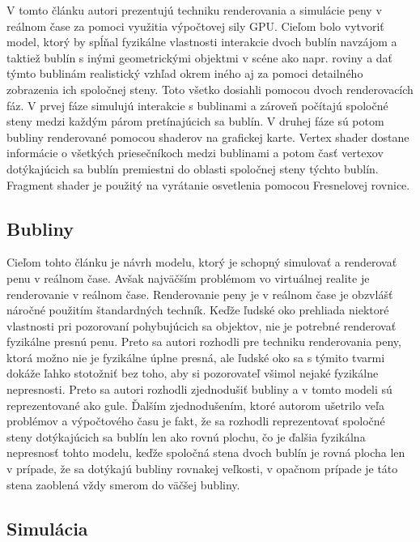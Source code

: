 V tomto článku autori prezentujú techniku renderovania a simulácie peny v reálnom čase za pomoci využitia výpočtovej sily GPU. Cieľom bolo vytvoriť model, ktorý by spĺňal fyzikálne vlastnosti interakcie dvoch bublín navzájom a taktiež bublín s inými geometrickými objektmi v scéne ako napr. roviny a dať týmto bublinám realistický vzhľad okrem iného aj za pomoci detailného zobrazenia ich spoločnej steny. Toto všetko dosiahli pomocou dvoch renderovacích fáz. V prvej fáze simulujú interakcie s bublinami a zároveň počítajú spoločné steny medzi každým párom pretínajúcich sa bublín. V druhej fáze sú potom bubliny renderované pomocou shaderov na grafickej karte. Vertex shader dostane informácie o všetkých priesečníkoch medzi bublinami a potom časť vertexov dotýkajúcich sa bublín premiestni do oblasti spoločnej steny týchto bublín. Fragment shader je použitý na vyrátanie osvetlenia pomocou Fresnelovej rovnice.

\subsection{Bubliny}

Cieľom tohto článku je návrh modelu, ktorý je schopný simulovať a renderovať penu v reálnom čase. Avšak najväčším problémom vo virtuálnej realite je renderovanie v reálnom čase. Renderovanie peny je v reálnom čase je obzvlášť náročné použitím štandardných techník. Keďže ľudské oko prehliada niektoré vlastnosti pri pozorovaní pohybujúcich sa objektov, nie je potrebné renderovať fyzikálne presnú penu. Preto sa autori rozhodli pre techniku renderovania peny, ktorá možno nie je fyzikálne úplne presná, ale ľudské oko sa s týmito tvarmi dokáže ľahko stotožniť bez toho, aby si pozorovateľ všimol nejaké fyzikálne nepresnosti. Preto sa autori rozhodli zjednodušiť bubliny a v tomto modeli sú reprezentované ako gule. Ďalším zjednodušením, ktoré autorom ušetrilo veľa problémov a výpočtového času je fakt, že sa rozhodli reprezentovať spoločné steny dotýkajúcich sa bublín len ako rovnú plochu, čo je ďalšia fyzikálna nepresnosť tohto modelu, keďže spoločná stena dvoch bublín je rovná plocha len v prípade, že sa dotýkajú bubliny rovnakej veľkosti, v opačnom prípade je táto stena zaoblená vždy smerom do väčšej bubliny.

\subsection{Simulácia}

